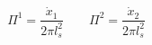 \begin{equation}
\Pi^1 = \frac{\dot{x}_1}{2 \pi l_s^2} \qquad \Pi^2 = \frac{\dot{x}_2}{2 \pi l_s^2}  
\end{equation}

